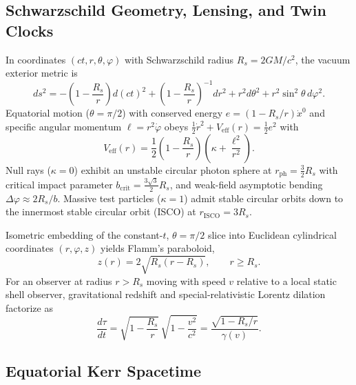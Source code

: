 \documentclass[12pt]{article}
\begin{document}
\subsection{Schwarzschild Geometry, Lensing, and Twin Clocks}

In coordinates $(ct, r, \theta, \varphi)$ with Schwarzschild radius $R_s = 2GM / c^2$, the vacuum exterior metric \cite{schwarzschild1916} is
\begin{equation}
ds^2 = -\left(1 - \frac{R_s}{r}\right) d(ct)^2
     + \left(1 - \frac{R_s}{r}\right)^{-1} dr^2
     + r^2 d\theta^2 + r^2 \sin^2\theta\, d\varphi^2.
\end{equation}
Equatorial motion ($\theta = \pi/2$) with conserved energy $e = (1 - R_s/r)\dot{x}^0$ and specific angular momentum $\ell = r^2\dot{\varphi}$ obeys $\frac{1}{2}\dot{r}^2 + V_{\text{eff}}(r) = \frac{1}{2}e^2$ with
\begin{equation}
V_{\text{eff}}(r) = \frac{1}{2}\left(1 - \frac{R_s}{r}\right)\left(\kappa + \frac{\ell^2}{r^2}\right).
\end{equation}
Null rays ($\kappa = 0$) exhibit an unstable circular photon sphere at $r_{\text{ph}} = \frac{3}{2} R_s$ with critical impact parameter $b_{\text{crit}} = \frac{3\sqrt{3}}{2} R_s$, and weak-field asymptotic bending $\Delta\varphi \approx 2 R_s / b$. Massive test particles ($\kappa = 1$) admit stable circular orbits down to the innermost stable circular orbit (ISCO) at $r_{\text{ISCO}} = 3 R_s$.

Isometric embedding of the constant-$t$, $\theta = \pi/2$ slice into Euclidean cylindrical coordinates $(r, \varphi, z)$ yields Flamm's paraboloid,
\begin{equation}
z(r) = 2\sqrt{R_s(r - R_s)}, \qquad r \ge R_s.
\end{equation}
For an observer at radius $r > R_s$ moving with speed $v$ relative to a local static shell observer, gravitational redshift and special-relativistic Lorentz dilation factorize as
\begin{equation}
\frac{d\tau}{dt} = \sqrt{1 - \frac{R_s}{r}}\,\sqrt{1 - \frac{v^2}{c^2}} = \frac{\sqrt{1 - R_s/r}}{\gamma(v)}.
\end{equation}

\subsection{Equatorial Kerr Spacetime}
\end{document}
